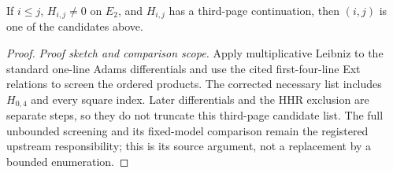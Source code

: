\begin{theorem}
If $i\leq j$, $H_{i,j}\ne0$ on $E_2$, and $H_{i,j}$ has a third-page continuation, then $(i,j)$ is one of the candidates above.
\end{theorem}
\begin{proof}
\textit{Proof sketch and comparison scope.}
Apply multiplicative Leibniz to the standard one-line Adams
differentials and use the cited first-four-line Ext relations to screen
the ordered products. The corrected necessary list includes $H_{0,4}$
and every square index. Later differentials and the HHR exclusion are
separate steps, so they do not truncate this third-page candidate list.
The full unbounded screening and its fixed-model comparison remain the
registered upstream responsibility; this is its source argument, not
a replacement by a bounded enumeration.
\end{proof}


